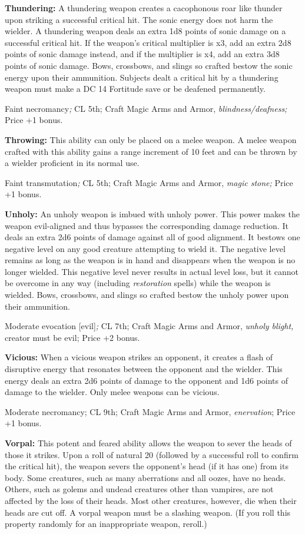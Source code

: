 \documentclass{article}
\begin{document}
\textbf{Thundering:} A thundering weapon creates a cacophonous roar like thunder 
upon striking a successful critical hit. The sonic energy does not harm the wielder. 
A thundering weapon deals an extra 1d8 points of sonic damage on a successful critical 
hit. If the weapon's critical multiplier is x3, add an extra 2d8 points of sonic 
damage instead, and if the multiplier is x4, add an extra 3d8 points of sonic damage. 
Bows, crossbows, and slings so crafted bestow the sonic energy upon their ammunition. 
Subjects dealt a critical hit by a thundering weapon must make a DC 14 Fortitude 
save or be deafened permanently.

Faint necromancy\textit{; }CL 5th; Craft Magic Arms and Armor, \textit{blindness/deafness; 
}Price +1 bonus.

\textbf{Throwing: }This ability can only be placed on a melee weapon. A melee weapon 
crafted with this ability gains a range increment of 10 feet and can be thrown 
by a wielder proficient in its normal use.

Faint transmutation\textit{; }CL 5th; Craft Magic Arms and Armor, \textit{magic 
stone; }Price +1 bonus.

\textbf{Unholy:} An unholy weapon is imbued with unholy power. This power makes 
the weapon evil-aligned and thus bypasses the corresponding damage reduction. It 
deals an extra 2d6 points of damage against all of good alignment. It bestows one 
negative level on any good creature attempting to wield it. The negative level 
remains as long as the weapon is in hand and disappears when the weapon is no longer 
wielded. This negative level never results in actual level loss, but it cannot 
be overcome in any way (including \textit{restoration }spells) while the weapon 
is wielded. Bows, crossbows, and slings so crafted bestow the unholy power upon 
their ammunition.

Moderate evocation [evil]\textit{; }CL 7th; Craft Magic Arms and Armor, \textit{unholy 
blight, }creator must be evil; Price +2 bonus.

\textbf{Vicious:} When a vicious weapon strikes an opponent, it creates a flash 
of disruptive energy that resonates between the opponent and the wielder. This 
energy deals an extra 2d6 points of damage to the opponent and 1d6 points of damage 
to the wielder. Only melee weapons can be vicious.

Moderate necromancy; CL 9th; Craft Magic Arms and Armor, \textit{enervation}; Price 
+1 bonus.

\textbf{Vorpal:} This potent and feared ability allows the weapon to sever the 
heads of those it strikes. Upon a roll of natural 20 (followed by a successful 
roll to confirm the critical hit), the weapon severs the opponent's head (if it 
has one) from its body. Some creatures, such as many aberrations and all oozes, 
have no heads. Others, such as golems and undead creatures other than vampires, 
are not affected by the loss of their heads. Most other creatures, however, die 
when their heads are cut off. A vorpal weapon must be a slashing weapon. (If you 
roll this property randomly for an inappropriate weapon, reroll.)
\end{document}
